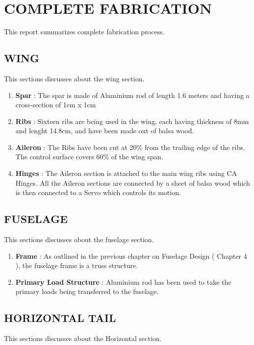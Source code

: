 \chapter{COMPLETE FABRICATION}
\label{ch4}
This report summarizes complete fabrication process.

\section{WING}
\label{s:ch4_wing_fab}
This sections discusses about the wing section.

\begin{enumerate}
\item \textbf{Spar} : The spar is made of Aluminium rod of length 1.6 meters and having a cross-section of 1cm x 1cm
\item \textbf{Ribs} : Sixteen ribs are being used in the wing, each having thickness of 8mm and lenght 14.8cm, and have been made out of balsa wood. 
\item \textbf{Aileron} : The Ribs have been cut at 20\% from the trailing edge of the ribs. The control surface covers 60\% of the wing span.
\item \textbf{Hinges} : The Aileron section is attached to the main wing ribs using CA Hinges. All the Aileron sections are connected by a sheet of balsa wood which is then connected to a Servo which controls its motion.
\end{enumerate}

\section{FUSELAGE}
\label{s:ch4_fuselage_fab}
This sections discusses about the fuselage section.

\begin{enumerate}
\item \textbf{Frame} : As outlined in the previous chapter on Fuselage Design ( Chapter 4 ), the fuselage frame is a truss structure.
\item \textbf{Primary Load Structure} : Aluminium rod has been used to take the primary loads being transferred to the fuselage.
\end{enumerate}


\section{HORIZONTAL TAIL}
\label{s:ch4_horztail_fab}
This sections discusses about the Horizontal section.

